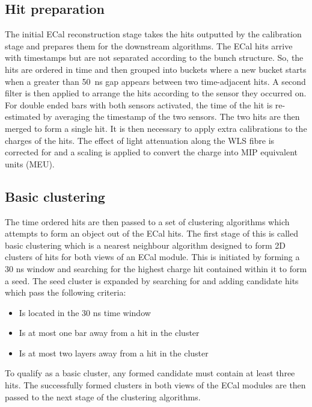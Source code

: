 \subsection{Hit preparation}
\label{subsec:ECalHitPerparation}
The initial ECal reconstruction stage takes the hits outputted by the calibration stage and prepares them for the downstream algorithms.  The ECal hits arrive with timestamps but are not separated according to the bunch structure.  So, the hits are ordered in time and then grouped into buckets where a new bucket starts when a greater than 50~ns gap appears between two time-adjacent hits.  A second filter is then applied to arrange the hits according to the sensor they occurred on.  For double ended bars with both sensors activated, the time of the hit is re-estimated by averaging the timestamp of the two sensors.  The two hits are then merged to form a single hit.
\newline
It is then necessary to apply extra calibrations to the charges of the hits.  The effect of light attenuation along the WLS fibre is corrected for and a scaling is applied to convert the charge into MIP equivalent units (MEU).

\subsection{Basic clustering}
\label{subsec:ECalBasicClustering}
The time ordered hits are then passed to a set of clustering algorithms which attempts to form an object out of the ECal hits.  The first stage of this is called basic clustering which is a nearest neighbour algorithm designed to form 2D clusters of hits for both views of an ECal module.  This is initiated by forming a 30 ns window and searching for the highest charge hit contained within it to form a seed.  The seed cluster is expanded by searching for and adding candidate hits which pass the following criteria:
\begin{itemize}
  \item Is located in the 30 ns time window
  \item Is at most one bar away from a hit in the cluster
  \item Is at most two layers away from a hit in the cluster
\end{itemize}
To qualify as a basic cluster, any formed candidate must contain at least three hits.  The successfully formed clusters in both views of the ECal modules are then passed to the next stage of the clustering algorithms. 

